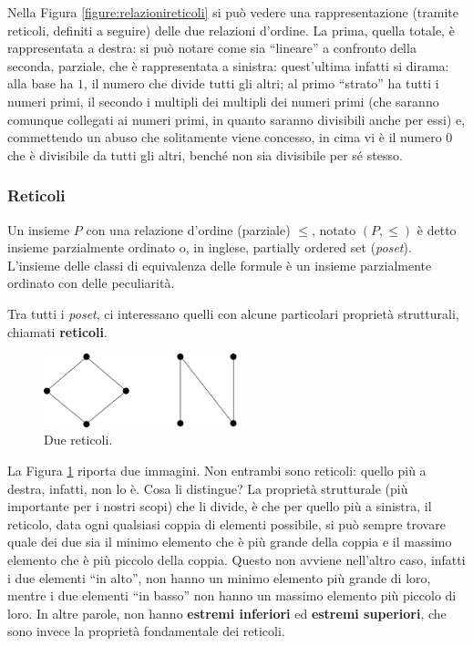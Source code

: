 Nella Figura \ref{figure:relazionireticoli} si può vedere una rappresentazione 
(tramite reticoli, definiti a seguire) delle due relazioni d'ordine. 
La prima, quella totale, è rappresentata a destra: si può notare come sia 
``lineare'' a confronto della seconda, parziale, che è rappresentata a 
sinistra: quest'ultima infatti si dirama: alla base ha $1$, il numero che 
divide tutti gli altri; al primo ``strato'' ha tutti i numeri primi, 
il secondo i multipli dei multipli dei numeri primi (che saranno comunque collegati 
ai numeri primi, in quanto saranno divisibili anche per essi) e, commettendo 
un abuso che solitamente viene concesso, in cima vi è il numero $0$ che è divisibile 
da tutti gli altri, benché non sia divisibile per sé stesso. 

\subsubsection{Reticoli}
Un insieme $P$ con una relazione d'ordine (parziale) $\leq$, 
notato $(P, \leq)$ è detto insieme parzialmente ordinato 
o, in inglese, partially ordered set (\textit{poset}). 
L'insieme delle classi di equivalenza 
delle formule è un insieme parzialmente ordinato con delle peculiarità. 

Tra tutti i \textit{poset}, ci interessano quelli con alcune particolari proprietà 
strutturali, chiamati \textbf{reticoli}. 

\begin{figure}[!h]
  \centering 
  \includegraphics[width=0.5\textwidth]{images/reticolo.png}
  \caption{Due reticoli.}
  \label{figure:reticolo}
\end{figure}


La Figura \ref{figure:reticolo} riporta due immagini. 
Non entrambi sono reticoli: quello più a destra, infatti, non lo è. 
Cosa li distingue? La proprietà strutturale (più importante per i nostri 
scopi) che li divide, è che per quello più a sinistra, il reticolo, data 
ogni qualsiasi coppia di elementi possibile, si può sempre trovare 
quale dei due sia il minimo elemento che è più grande della coppia e il 
massimo elemento che è più piccolo della coppia. Questo non avviene nell'altro 
caso, infatti i due elementi ``in alto'', non hanno un minimo elemento 
più grande di loro, mentre i due elementi ``in basso'' non hanno un massimo 
elemento più piccolo di loro. In altre parole, non hanno 
\textbf{estremi inferiori} ed \textbf{estremi superiori}, che sono 
invece la proprietà fondamentale dei reticoli. 

